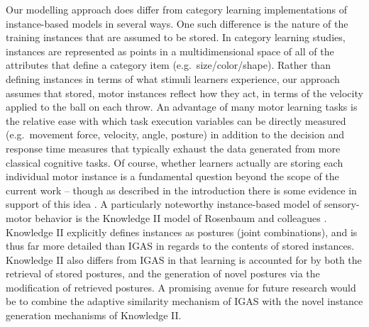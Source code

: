 \documentclass[
  12pt,
  letterpaper,
]{article}
\begin{document}
Our modelling approach does differ from category learning
implementations of instance-based models in several ways. One such
difference is the nature of the training instances that are assumed to
be stored. In category learning studies, instances are represented as
points in a multidimensional space of all of the attributes that define
a category item (e.g.~size/color/shape). Rather than defining instances
in terms of what stimuli learners experience, our approach assumes that
stored, motor instances reflect how they act, in terms of the velocity
applied to the ball on each throw. An advantage of many motor learning
tasks is the relative ease with which task execution variables can be
directly measured (e.g.~movement force, velocity, angle, posture) in
addition to the decision and response time measures that typically
exhaust the data generated from more classical cognitive tasks. Of
course, whether learners actually are storing each individual motor
instance is a fundamental question beyond the scope of the current work
-- though as described in the introduction there is some evidence in
support of this idea
\autocite{chamberlinNoteSchemaExemplar1992,crumpEpisodicContributionsSequential2010,hommelEventFilesEvidence1998,meighWhatMemoryRepresentation2018,poldrackRelationshipSkillLearning1999}.
A particularly noteworthy instance-based model of sensory-motor behavior
is the Knowledge II model of Rosenbaum and colleagues
\autocite{cohenWhereGraspsAre2004,rosenbaumPlanningReachesEvaluating1995}.
Knowledge II explicitly defines instances as postures (joint
combinations), and is thus far more detailed than IGAS in regards to the
contents of stored instances. Knowledge II also differs from IGAS in
that learning is accounted for by both the retrieval of stored postures,
and the generation of novel postures via the modification of retrieved
postures. A promising avenue for future research would be to combine the
adaptive similarity mechanism of IGAS with the novel instance generation
mechanisms of Knowledge II.
\end{document}

